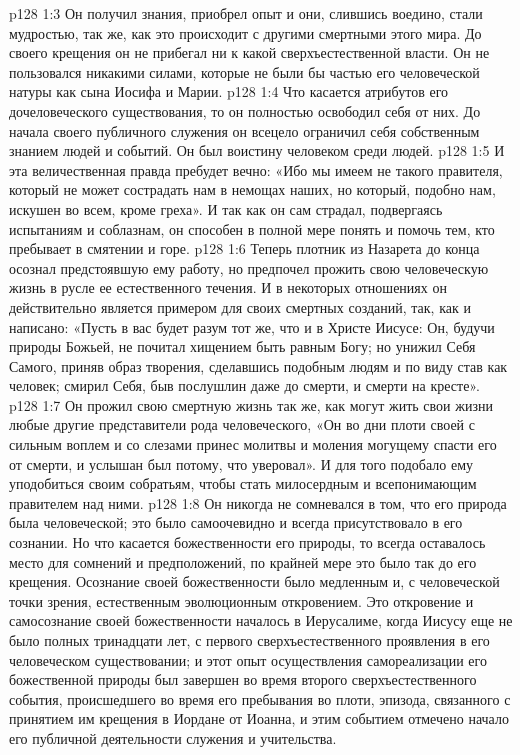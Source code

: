 \vs p128 1:3 Он получил знания, приобрел опыт и они, слившись воедино, стали мудростью, так же, как это происходит с другими смертными этого мира. До своего крещения он не прибегал ни к какой сверхъестественной власти. Он не пользовался никакими силами, которые не были бы частью его человеческой натуры как сына Иосифа и Марии.
\vs p128 1:4 Что касается атрибутов его дочеловеческого существования, то он полностью освободил себя от них. До начала своего публичного служения он всецело ограничил себя собственным знанием людей и событий. Он был воистину человеком среди людей.
\vs p128 1:5 \pc И эта величественная правда пребудет вечно: «Ибо мы имеем не такого правителя, который не может сострадать нам в немощах наших, но который, подобно нам, искушен во всем, кроме греха». И так как он сам страдал, подвергаясь испытаниям и соблазнам, он способен в полной мере понять и помочь тем, кто пребывает в смятении и горе.
\vs p128 1:6 \pc Теперь плотник из Назарета до конца осознал предстоявшую ему работу, но предпочел прожить свою человеческую жизнь в русле ее естественного течения. И в некоторых отношениях он действительно является примером для своих смертных созданий, так, как и написано: «Пусть в вас будет разум тот же, что и в Христе Иисусе: Он, будучи природы Божьей, не почитал хищением быть равным Богу; но унижил Себя Самого, приняв образ творения, сделавшись подобным людям и по виду став как человек; смирил Себя, быв послушлин даже до смерти, и смерти на кресте».
\vs p128 1:7 Он прожил свою смертную жизнь так же, как могут жить свои жизни любые другие представители рода человеческого, «Он во дни плоти своей с сильным воплем и со слезами принес молитвы и моления могущему спасти его от смерти, и услышан был потому, что уверовал». И для того подобало ему  уподобиться своим собратьям, чтобы стать милосердным и всепонимающим правителем над ними.
\vs p128 1:8 Он никогда не сомневался в том, что его природа была человеческой; это было самоочевидно и всегда присутствовало в его сознании. Но что касается божественности его природы, то всегда оставалось место для сомнений и предположений, по крайней мере это было так до его крещения. Осознание своей божественности было медленным и, с человеческой точки зрения, естественным эволюционным откровением. Это откровение и самосознание своей божественности началось в Иерусалиме, когда Иисусу еще не было полных тринадцати лет, с первого сверхъестественного проявления в его человеческом существовании; и этот опыт осуществления самореализации его божественной природы был завершен во время второго сверхъестественного события, происшедшего во время его пребывания во плоти, эпизода, связанного с принятием им крещения в Иордане от Иоанна, и этим событием отмечено начало его публичной деятельности служения и учительства.
